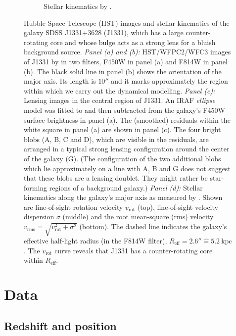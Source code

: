 \documentclass[useAMS,usenatbib]{mnras}
\begin{document}
\begin{figure}
\begin{subfigure}{.5\textwidth}
  \caption{Stellar kinematics by \citet{SWELLSV}.}
  \label{fig:kinematics}
\end{subfigure}
\caption{Hubble Space Telescope (HST) images and stellar kinematics of the galaxy SDSS J1331+3628 (J1331), which has a large counter-rotating core and whose bulge acts as a strong lens for a bluish background source. \emph{Panel (a) and (b):} HST/WFPC2/WFC3 images of J1331 by \citet{SWELLSI} in two filters, F450W in panel (a) and F814W in panel (b). The black solid line in panel (b) shows the orientation of the major axis. Its length is $10''$ and it marks approximately the region within which we carry out the dynamical modelling. \emph{Panel (c):} Lensing images in the central region of J1331.  An IRAF \emph{ellipse} model was fitted to and then subtracted from the galaxy's F450W surface brightness in panel (a). The (smoothed) residuals within the white square in panel (a) are shown in panel (c). The four bright blobs (A, B, C and D), which are visible in the residuals, are arranged in a typical strong lensing configuration around the center of the galaxy (G). (The configuration of the two additional blobs which lie approximately on a line with A, B and G does not suggest that these blobs are a lensing doublet. They might rather be star-forming regions of a background galaxy.) \emph{Panel (d):} Stellar kinematics along the galaxy's major axis as measured by \citet{SWELLSV}. Shown are line-of-sight rotation velocity $v_\text{rot}$ (top), line-of-sight velocity dispersion $\sigma$ (middle) and the root mean-square (rms) velocity $v_\text{rms} = \sqrt{v_\text{rot}^2 + \sigma^2}$ (bottom). The dashed line indicates the galaxy's effective half-light radius (in the F814W filter), $R_\text{eff} = 2.6'' \hat{=} 5.2~\text{kpc}$. The $v_\text{rot}$ curve reveals that J1331 has a counter-rotating core within $R_\text{eff}$.}
\label{fig:specialJ1331}
\end{figure}

\section{Data} \label{sec:data}

\subsection{Redshift and position}
\end{document}
